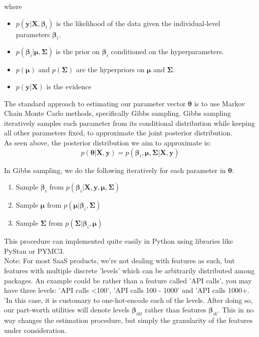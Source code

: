 \documentclass{article}
\begin{document}
where
\begin{itemize}
  \item \( p(\mathbf{y} | \mathbf{X}, \boldsymbol{\beta}_i) \) is the likelihood of the data given the individual-level parameters \( \boldsymbol{\beta}_i \).
  \item \( p(\boldsymbol{\beta}_i | \boldsymbol{\mu}, \boldsymbol{\Sigma}) \) is the prior on \( \boldsymbol{\beta}_i \) conditioned on the hyperparameters.
  \item \( p(\boldsymbol{\mu}) \) and \( p(\boldsymbol{\Sigma}) \) are the hyperpriors on \( \boldsymbol{\mu} \) and \( \boldsymbol{\Sigma} \).
  \item \( p(\mathbf{y} | \mathbf{X}) \) is the evidence 
\end{itemize}



The standard approach to estimating our parameter vector \( \boldsymbol{\theta} \) is to use Markov Chain Monte Carlo methods, specifically Gibbs sampling. Gibbs sampling iteratively samples each parameter from its conditional distribution while keeping all other parameters fixed, to approximate the joint posterior distribution. \\

As seen above, the posterior distribution we aim to approximate is:
\[
p(\boldsymbol{\theta} | \mathbf{X}, \mathbf{y}) = p(\boldsymbol{\beta}_i, \boldsymbol{\mu}, \boldsymbol{\Sigma} | \mathbf{X}, \mathbf{y})
\]

In Gibbs sampling, we do the following iteratively for each parameter in \( \boldsymbol{\theta} \):

\begin{enumerate}
    \item Sample \( \boldsymbol{\beta}_i \) from \( p(\boldsymbol{\beta}_i | \mathbf{X}, \mathbf{y}, \boldsymbol{\mu}, \boldsymbol{\Sigma}) \)
    \item Sample \( \boldsymbol{\mu} \) from \( p(\boldsymbol{\mu} | \boldsymbol{\beta}_i, \boldsymbol{\Sigma}) \)
    \item Sample \( \boldsymbol{\Sigma} \) from \( p(\boldsymbol{\Sigma} | \boldsymbol{\beta}_i, \boldsymbol{\mu}) \)
\end{enumerate}


This procedure can implemented quite easily in Python using libraries like PyStan or PYMC3. \\

Note: For most SaaS products, we're not dealing with features as such, but features with multiple discrete 'levels' which can be arbitrarily distributed among packages. An example could be rather than a feature called 'API calls', you may have three levels: 'API calls <100', 'API calls 100 - 1000' and 'API calls 1000+. 'In this case, it is customary to one-hot-encode each of the levels. After doing so, our part-worth utilities will denote levels $\boldsymbol{\beta}_{ikl}$ rather than features $\boldsymbol{\beta}_{ik}$. This in no way changes the estimation procedure, but simply the granularity of the features under consideration. \\
\end{document}
